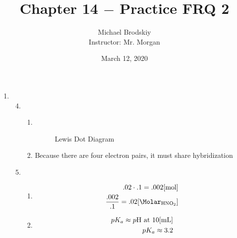 \documentclass[12pt]{article}
\title{Chapter 14 $-$ Practice FRQ 2}
\date{March 12, 2020}
\author{Michael Brodskiy\\ \small Instructor: Mr. Morgan}
\begin{document}
\maketitle

\begin{enumerate}

  \item 

    \begin{enumerate}

        \setcounter{enumii}{3}

      \item 

        \begin{enumerate}

          \item \textbf{ }\\

            \begin{center}
            \begin{figure}[h]
              \centering
              
              \caption{ Lewis Dot Diagram}
              \label{fig:1}
            \end{figure}
          \end{center}

        \item Because there are four electron pairs, it must share  hybridization

        \end{enumerate}

      \item

        \begin{enumerate}

          \item 

            \begin{equation}
              \begin{split}
                .02\cdot.1=.002[\si{\mole}]\\
                \frac{.002}{.1}=.02[\si{\Molar}_{\ce{HNO2}}]
              \end{split}
              \label{1}
            \end{equation}

          \item

            \begin{equation}
              \begin{split}
                pK_a\approx p\ce{H}\text{ at }10[\si{\milli\liter}]\\
                pK_a\approx 3.2
              \end{split}
              \label{2}
            \end{equation}


\end{enumerate}
\end{enumerate}
\end{enumerate}
\end{document}

